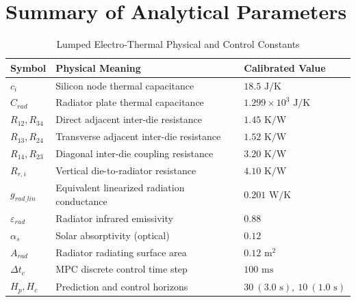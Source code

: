 \documentclass[11pt,a4paper]{article}
\begin{document}
\section{Summary of Analytical Parameters}
\begin{table}[h]
\centering
\caption{Lumped Electro-Thermal Physical and Control Constants}
\begin{tabular}{lll}
\toprule
\textbf{Symbol} & \textbf{Physical Meaning} & \textbf{Calibrated Value} \\
\midrule
$c_i$ & Silicon node thermal capacitance & $18.5\text{ J/K}$ \\
$C_{rad}$ & Radiator plate thermal capacitance & $1.299 \times 10^3\text{ J/K}$ \\
$R_{12}, R_{34}$ & Direct adjacent inter-die resistance & $1.45\text{ K/W}$ \\
$R_{13}, R_{24}$ & Transverse adjacent inter-die resistance & $1.52\text{ K/W}$ \\
$R_{14}, R_{23}$ & Diagonal inter-die coupling resistance & $3.20\text{ K/W}$ \\
$R_{r, i}$ & Vertical die-to-radiator resistance & $4.10\text{ K/W}$ \\
$g_{rad\_lin}$ & Equivalent linearized radiation conductance & $0.201\text{ W/K}$ \\
$\varepsilon_{rad}$ & Radiator infrared emissivity & $0.88$ \\
$\alpha_s$ & Solar absorptivity (optical) & $0.12$ \\
$A_{rad}$ & Radiator radiating surface area & $0.12\text{ m}^2$ \\
$\Delta t_c$ & MPC discrete control time step & $100\text{ ms}$ \\
$H_p, H_c$ & Prediction and control horizons & $30\ (3.0\text{ s}),\ 10\ (1.0\text{ s})$ \\
\bottomrule
\end{tabular}
\end{table}
\end{document}
